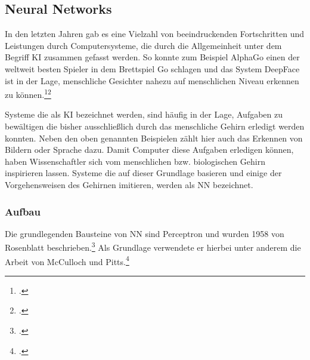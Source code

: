 
\subsection{Neural Networks} \label{sec:NN}
In den letzten Jahren gab es eine Vielzahl von beeindruckenden Fortschritten und Leistungen durch Computersysteme, die durch die Allgemeinheit unter dem Begriff \ac{KI} zusammen gefasst werden. So konnte zum Beispiel AlphaGo einen der weltweit besten Spieler in dem Brettspiel Go schlagen und das System DeepFace ist in der Lage, menschliche Gesichter nahezu auf menschlichen Niveau erkennen zu können.\footcites[Vgl.][]{spiegelGoogleComputerAlphaGo2016}\footcite[Vgl.][]{taigman2014deepface}

Systeme die als \ac{KI} bezeichnet werden, sind häufig in der Lage, Aufgaben zu bewältigen die bisher ausschließlich durch das menschliche Gehirn erledigt werden konnten. Neben den oben genannten Beispielen zählt hier auch das Erkennen von Bildern oder Sprache dazu. Damit Computer diese Aufgaben erledigen können, haben Wissenschaftler sich vom menschlichen bzw. biologischen Gehirn inspirieren lassen. Systeme die auf dieser Grundlage basieren und einige der Vorgehensweisen des Gehirnen imitieren, werden als \ac{NN} bezeichnet.

\subsubsection{Aufbau}
Die grundlegenden Bausteine von \ac{NN} sind Perceptron und wurden 1958 von Rosenblatt beschrieben.\footcite[Vgl.][]{rosenblattPerceptronProbabilisticModel1958} Als Grundlage verwendete er hierbei unter anderem die Arbeit von McCulloch und Pitts.\footcite[Vgl.][]{mccullochLogicalCalculusIdeas1943}


